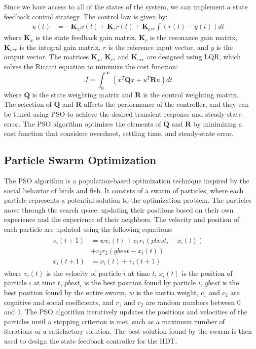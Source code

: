 Since we have access to all of the states of the system, we can implement a state feedback control strategy. The control law is given by:
\begin{align}
    u(t) &= -\mathbf{K}_x x(t) + \mathbf{K}_r r(t) + \mathbf{K}_{err} \int (r(t) - y(t)) dt
\end{align}
where $\mathbf{K}_x$ is the state feedback gain matrix, $\mathbf{K}_r$ is the resonance gain matrix, $\mathbf{K}_{err}$ is the integral gain matrix, $r$ is the reference input vector, and $y$ is the output vector. The matrices $\mathbf{K}_x$, $\mathbf{K}_r$, and $\mathbf{K}_{err}$ are designed using LQR, which solves the Riccati equation to minimize the cost function:
\begin{equation}
    J = \int_0^\infty (x^T \mathbf{Q} x + u^T \mathbf{R} u) dt
\end{equation}
where $\mathbf{Q}$ is the state weighting matrix and $\mathbf{R}$ is the control weighting matrix. The selection of $\mathbf{Q}$ and $\mathbf{R}$ affects the performance of the controller, and they can be tuned using PSO to achieve the desired transient response and steady-state error. The PSO algorithm optimizes the elements of $\mathbf{Q}$ and $\mathbf{R}$ by minimizing a cost function that considers overshoot, settling time, and steady-state error.

\subsection{Particle Swarm Optimization}

The PSO algorithm is a population-based optimization technique inspired by the social behavior of birds and fish. It consists of a swarm of particles, where each particle represents a potential solution to the optimization problem. The particles move through the search space, updating their positions based on their own experience and the experience of their neighbors. The velocity and position of each particle are updated using the following equations:
\begin{align}
    \begin{aligned}
        v_i(t+1) &= w v_i(t) + c_1 r_1 (pbest_i - x_i(t))\\
        &+ c_2 r_2 (gbest - x_i(t)) \\
        x_i(t+1) &= x_i(t) + v_i(t+1)
    \end{aligned}
\end{align}
where $v_i(t)$ is the velocity of particle $i$ at time $t$, $x_i(t)$ is the position of particle $i$ at time $t$, $pbest_i$ is the best position found by particle $i$, $gbest$ is the best position found by the entire swarm, $w$ is the inertia weight, $c_1$ and $c_2$ are cognitive and social coefficients, and $r_1$ and $r_2$ are random numbers between 0 and 1.
The PSO algorithm iteratively updates the positions and velocities of the particles until a stopping criterion is met, such as a maximum number of iterations or a satisfactory solution. The best solution found by the swarm is then used to design the state feedback controller for the HDT.